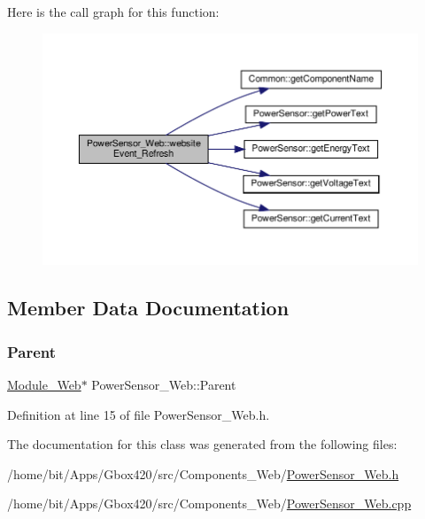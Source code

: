 Here is the call graph for this function\+:
\nopagebreak
\begin{figure}[H]
\begin{center}
\leavevmode
\includegraphics[width=350pt]{class_power_sensor___web_a430e9c91f3fa760d7930cee367b92125_cgraph}
\end{center}
\end{figure}


\subsection{Member Data Documentation}
\mbox{\label{class_power_sensor___web_afa86ee052a15b350d2fba45a45e0d02e}} 
\subsubsection{\texorpdfstring{Parent}{Parent}}
{\footnotesize\ttfamily \hyperlink{class_module___web}{Module\+\_\+\+Web}$\ast$ Power\+Sensor\+\_\+\+Web\+::\+Parent\hspace{0.3cm}{\ttfamily [protected]}}



Definition at line 15 of file Power\+Sensor\+\_\+\+Web.\+h.



The documentation for this class was generated from the following files\+:\begin{DoxyCompactItemize}
\item 
/home/bit/\+Apps/\+Gbox420/src/\+Components\+\_\+\+Web/\hyperlink{_power_sensor___web_8h}{Power\+Sensor\+\_\+\+Web.\+h}\item 
/home/bit/\+Apps/\+Gbox420/src/\+Components\+\_\+\+Web/\hyperlink{_power_sensor___web_8cpp}{Power\+Sensor\+\_\+\+Web.\+cpp}\end{DoxyCompactItemize}
